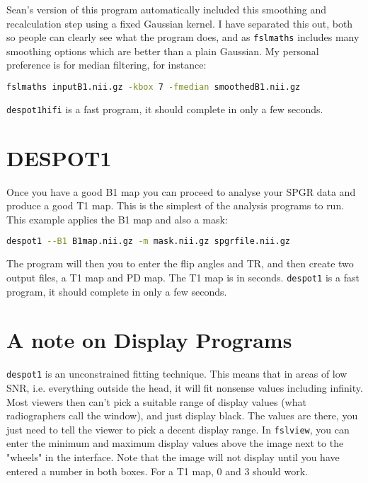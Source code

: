 \documentclass{report}
\begin{document}
Sean's version of this program automatically included this smoothing and recalculation step using a fixed Gaussian kernel. I have separated this out, both so people can clearly see what the program does, and as \texttt{fslmaths} includes many smoothing options which are better than a plain Gaussian. My personal preference is for median filtering, for instance:

\begin{lstlisting}[language=sh]
fslmaths inputB1.nii.gz -kbox 7 -fmedian smoothedB1.nii.gz
\end{lstlisting}

\texttt{despot1hifi} is a fast program, it should complete in only a few seconds.

\section{DESPOT1}

Once you have a good B1 map you can proceed to analyse your SPGR data and produce a good T1 map. This is the simplest of the analysis programs to run. This example applies the B1 map and also a mask:

\begin{lstlisting}[language=sh]
despot1 --B1 B1map.nii.gz -m mask.nii.gz spgrfile.nii.gz
\end{lstlisting}

The program will then you to enter the flip angles and TR, and then create two output files, a T1 map and PD map. The T1 map is in seconds. \texttt{despot1} is a fast program, it should complete in only a few seconds.

\section{A note on Display Programs}

\texttt{despot1} is an unconstrained fitting technique. This means that in areas of low SNR, i.e. everything outside the head, it will fit nonsense values including infinity. Most viewers then can't pick a suitable range of display values (what radiographers call the window), and just display black. The values are there, you just need to tell the viewer to pick a decent display range. In \texttt{fslview}, you can enter the minimum and maximum display values above the image next to the "wheels" in the interface. Note that the image will not display until you have entered a number in both boxes. For a T1 map, 0 and 3 should work.
\end{document}
